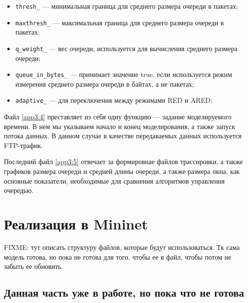 \begin{itemize}

        \item \verb+thresh_+ --- минимальная граница для среднего размера
                очереди в пакетах;

        \item \verb+maxthresh_+ --- максимальная граница для среднего размера
                очереди в пакетах;

        \item \verb+q_weight_+  --- вес очереди, используется для вычисления
                среднего размера очереди;

        \item \verb+queue_in_bytes_+  --- принимает значение true, если
                используется режим измерения среднего размера очереди в байтах,
                а не пакетах;
                
        \item \verb+adaptive_+ --- для переключения между режимами RED и ARED;

\end{itemize}

Файл \ref{app3:4} преставляет из себя одну функцию --- задание моделируемого
времени. В нем мы указываем начало и конец моделирования, а также запуск потока
данных. В данном случае в качестве передаваемых данных используется FTP-трафик.

Последний файл \ref{app3:5} отвечает за формировнае файлов трассировки, а также
графиков размера очереди и средней длины очереди, а также размера окна, как
основные показатели, необходимые для сравнения алгоритмов управления очередью.




\section{Реализация в Mininet} %
\label{chap2:sec3}

FIXME: тут описать структуру файлов, которые будут использоваться. Тк сама модель готова, но пока не готова для того, чтобы ее в файл, чтобы потом не забыть ее обновить.

\subsection{Данная часть уже в работе, но пока что не готова} 




